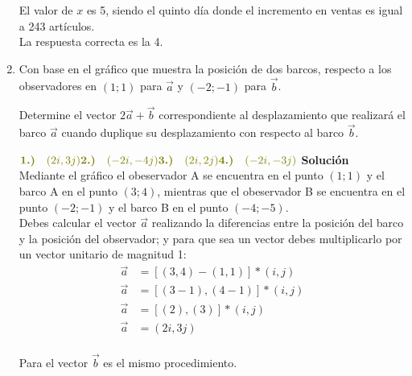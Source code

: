 \documentclass[11pt, a4paper]{article} %
\theoremstyle{dotlessP}
\theoremstyle{dotlessS}
\begin{document}
\begin{enumerate}[label=\color{dg}\theenumi.]
El valor de \( x \) es 5, siendo el quinto día donde el incremento en ventas es igual a 243 artículos.\\
{\color{dh} La respuesta correcta es la 4.}
\\
\item {\color{db} Con base en el gráfico que muestra la posición de dos barcos, respecto a los observadores en \((1; 1)\) para $\vec{a}$ y \((-2; -1)\) para $\vec{b}$.
 \begin{center}
\end{center}
Determine el vector $2$$\vec{a} + \vec{b}$ correspondiente al desplazamiento que realizará el barco $\vec{a}$ cuando duplique su desplazamiento con respecto al barco $\vec{b}$.
        }
 \(
\vspace{1\baselineskip} \\ 	
     {\color{dh} \textbf{1.)} \quad (2i,3j)} \vspace{1\baselineskip} \\ 	
     {\color{dh} \textbf{2.)} \quad (-2i,-4j)} \vspace{1\baselineskip} \\ 	
     {\color{dh} \textbf{3.)} \quad (2i,2j)} \vspace{1\baselineskip} \\ 	
     {\color{dh} \textbf{4.)} \quad (-2i,-3j)}   \vspace{1\baselineskip} \\ 	
      \)
        \textbf{Solución} 
\\ Mediante el gráfico el obeservador A se encuentra en el punto \((1; 1)\) y el barco A en el punto \((3; 4)\), mientras que el obeservador B se encuentra en el punto \((-2 ; -1)\) y el barco B en el punto \((-4; -5)\).
\\ Debes calcular el vector $\vec{a}$ realizando la diferencias entre la posición del barco y la posición del observador; y para que sea un vector debes multiplicarlo por un vector unitario de magnitud 1: 
\begin{align*}
\vec{a} &=[(3, 4)-(1, 1)]*(i,j)
\\
\vec{a} &=[(3-1),(4-1)]*(i,j)
\\
\vec{a} &=[(2),(3)]*(i,j)
\\
\vec{a} &=(2i,3j)
\end{align*}
\\ Para el vector $\vec{b}$ es el mismo procedimiento. 
\begin{align*}

\end{align*}
\end{enumerate}
\end{document}
